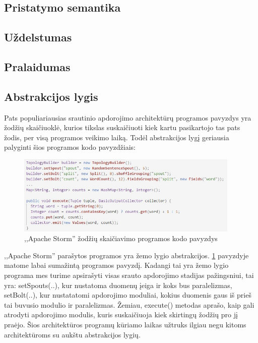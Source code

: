 \documentclass{VUMIFPSkursinis}
\begin{document}
\subsection{Pristatymo semantika}

\subsection{Uždelstumas}

\subsection{Pralaidumas}

\subsection{Abstrakcijos lygis}
Pats populiariausias srautinio apdorojimo architektūrų programos pavyzdys yra žodžių skaičiuoklė, kurios tikslas suskaičiuoti kiek kartu pasikartojo tas pats žodis, per visą programos veikimo laiką. Todėl abstrakcijos lygį
geriausia palyginti šios programos kodo pavyzdžiais\cite{petr2016}:

\begin{figure}[!htbp]
    \centering
    \includegraphics[width=0.95\textwidth]{img/StormAPI.jpg}
    \caption{,,Apache Storm'' žodžių skaičiavimo programos kodo pavyzdys}
    \label{fig:stormapi}
\end{figure} \par

,,Apache Storm'' parašytos programos yra žemo lygio abstrakcijos. \ref{fig:stormapi} pavyzdyje matome labai sumažintą programos pavyzdį. Kadangi tai yra žemo lygio programa mes turime apsirašyti visas srauto apdorojimo stadijas
pažingsniui, tai yra: setSpouts(..), kur nustatoma duomenų įeiga ir koks bus paralelizmas, setBolt(..), kur nustatatomi apdorojimo moduliai, kokius duomenis gaus iš prieš tai buvusio modulio ir paralelizmas.
Žemiau, execute() metodas aprašo, kaip gali atrodyti apdorojimo modulis, kuris suskaičiuoja kiek skirtingų žodžių pro jį praėjo. Šios architektūros programų kūriamo laikas užtruks ilgiau negu kitoms 
architektūroms su aukštu abstrakcijos lygių.
\end{document}
